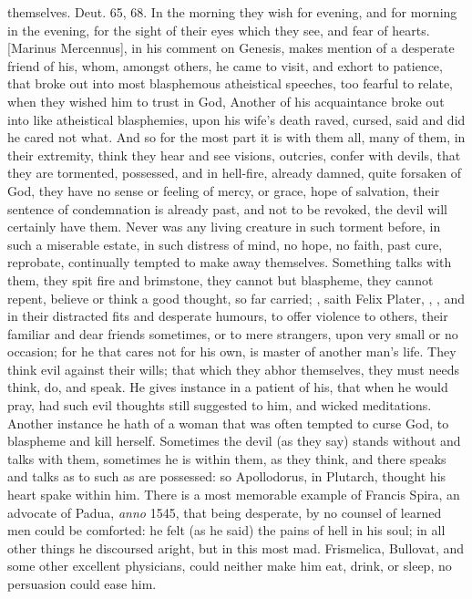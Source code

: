 {themselves. Deut.  65, 68. In the morning they wish for evening,
and for morning in the evening, for the sight of their eyes which they
see, and fear of hearts. [Marinus Mercennus], in his comment on
Genesis, makes mention of a desperate friend of his, whom, amongst
others, he came to visit, and exhort to patience, that broke out into
most blasphemous atheistical speeches, too fearful to relate, when they
wished him to trust in God,  Another of his acquaintance broke out
into like atheistical blasphemies, upon his wife's death raved, cursed,
said and did he cared not what. And so for the most part it is with
them all, many of them, in their extremity, think they hear and see
visions, outcries, confer with devils, that they are tormented,
possessed, and in hell-fire, already damned, quite forsaken of God,
they have no sense or feeling of mercy, or grace, hope of salvation,
their sentence of condemnation is already past, and not to be revoked,
the devil will certainly have them. Never was any living creature in
such torment before, in such a miserable estate, in such distress of
mind, no hope, no faith, past cure, reprobate, continually tempted to
make away themselves. Something talks with them, they spit fire and
brimstone, they cannot but blaspheme, they cannot repent, believe or
think a good thought, so far carried; , saith Felix Plater, , \etc{}, and in their distracted fits and desperate humours, to
offer violence to others, their familiar and dear friends sometimes, or
to mere strangers, upon very small or no occasion; for he that cares
not for his own, is master of another man's life. They think evil
against their wills; that which they abhor themselves, they must needs
think, do, and speak. He gives instance in a patient of his, that when
he would pray, had such evil thoughts still suggested to him, and
wicked meditations. Another instance he hath of a woman that was
often tempted to curse God, to blaspheme and kill herself. Sometimes
the devil (as they say) stands without and talks with them, sometimes
he is within them, as they think, and there speaks and talks as to such
as are possessed: so Apollodorus, in Plutarch, thought his heart spake
within him. There is a most memorable example of Francis Spira,
an advocate of Padua, \emph{anno} 1545, that being desperate, by no counsel of
learned men could be comforted: he felt (as he said) the pains of hell
in his soul; in all other things he discoursed aright, but in this most
mad. Frismelica, Bullovat, and some other excellent physicians, could
neither make him eat, drink, or sleep, no persuasion could ease him.

}
